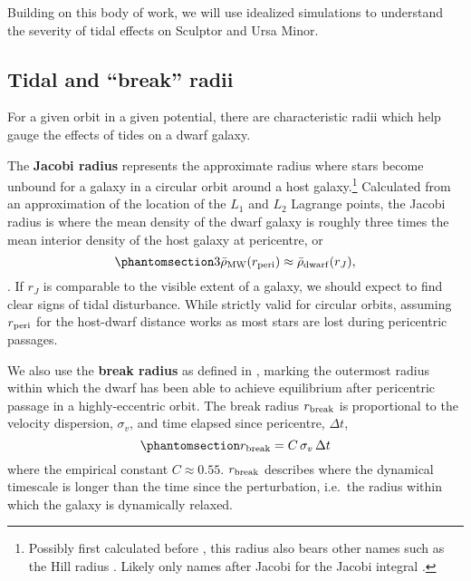 Building on this body of work, we will use idealized simulations to
understand the severity of tidal effects on Sculptor and Ursa Minor.

\subsection{Tidal and ``break'' radii}\label{sec:break_radii}

For a given orbit in a given potential, there are characteristic radii
which help gauge the effects of tides on a dwarf galaxy.

The \textbf{Jacobi radius} represents the approximate radius where stars
become unbound for a galaxy in a circular orbit around a host
galaxy.\footnote{Possibly first calculated before \citet{laplace1798},
  this radius also bears other names such as the Hill radius
  \citep[from][]{hill1878}. Likely only names after Jacobi for the
  Jacobi integral \citep{jacobi1836}.} Calculated from an approximation
of the location of the \(L_1\) and \(L_2\) Lagrange points, the Jacobi
radius is where the mean density of the dwarf galaxy is roughly three
times the mean interior density of the host galaxy at pericentre, or
\begin{equation}\protect\phantomsection\label{eq:r_jacobi}{
3\bar \rho_{\rm MW}(r_{\rm peri}) \approx \bar \rho_{\rm dwarf}(r_J),
}\end{equation} \citep[ eq. 7-84]{BT1987}. If \(r_J\) is comparable to
the visible extent of a galaxy, we should expect to find clear signs of
tidal disturbance. While strictly valid for circular orbits, assuming
\(r_{\rm peri}\) for the host-dwarf distance works as most stars are
lost during pericentric passages.

We also use the \textbf{break radius} as defined in
\citet{penarrubia+2009}, marking the outermost radius within which the
dwarf has been able to achieve equilibrium after pericentric passage in
a highly-eccentric orbit. The break radius \(r_{\rm break}\) is
proportional to the velocity dispersion, \(\sigma_v\), and time elapsed
since pericentre, \(\Delta t\),
\begin{equation}\protect\phantomsection\label{eq:r_break}{
r_{\rm break} = C\,\sigma_{v}\,\Delta t
}\end{equation} where the empirical constant \(C \approx 0.55\).
\(r_{\rm break}\) describes where the dynamical timescale is longer than
the time since the perturbation, i.e.~the radius within which the galaxy
is dynamically relaxed.

